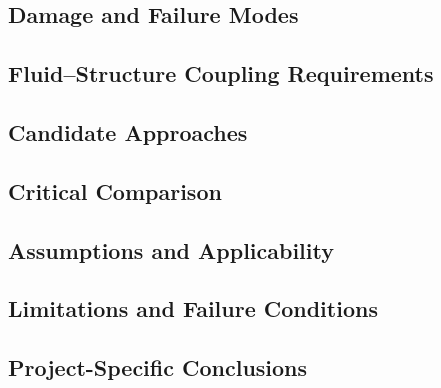 
\subsection{Damage and Failure Modes}
\label{sec:res-str-rsp-damage-failure-modes}


\subsection{Fluid--Structure Coupling Requirements}
\label{sec:res-str-rsp-fluid-structure-coupling-requirements}


\subsection{Candidate Approaches}
\label{sec:res-str-rsp-candidate-approaches}


\subsection{Critical Comparison}
\label{sec:res-str-rsp-critical-comparison}


\subsection{Assumptions and Applicability}
\label{sec:res-str-rsp-assumptions}


\subsection{Limitations and Failure Conditions}
\label{sec:res-str-rsp-limitations}


\subsection{Project-Specific Conclusions}
\label{sec:res-str-rsp-conclusions}

